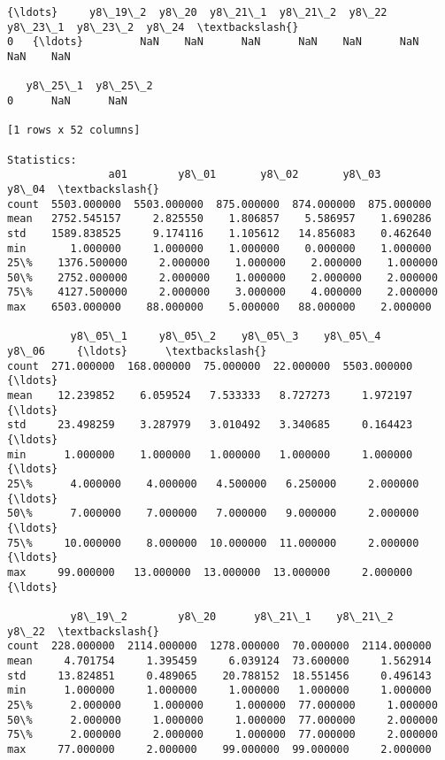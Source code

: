 \documentclass[11pt]{article}
\begin{document}
\begin{Verbatim}[commandchars=\\\{\}]
    {\ldots}     y8\_19\_2  y8\_20  y8\_21\_1  y8\_21\_2  y8\_22  y8\_23\_1  y8\_23\_2  y8\_24  \textbackslash{}
0   {\ldots}         NaN    NaN      NaN      NaN    NaN      NaN      NaN    NaN   

   y8\_25\_1  y8\_25\_2  
0      NaN      NaN  

[1 rows x 52 columns]

Statistics: 
                a01        y8\_01       y8\_02       y8\_03       y8\_04  \textbackslash{}
count  5503.000000  5503.000000  875.000000  874.000000  875.000000   
mean   2752.545157     2.825550    1.806857    5.586957    1.690286   
std    1589.838525     9.174116    1.105612   14.856083    0.462640   
min       1.000000     1.000000    1.000000    0.000000    1.000000   
25\%    1376.500000     2.000000    1.000000    2.000000    1.000000   
50\%    2752.000000     2.000000    1.000000    2.000000    2.000000   
75\%    4127.500000     2.000000    3.000000    4.000000    2.000000   
max    6503.000000    88.000000    5.000000   88.000000    2.000000   

          y8\_05\_1     y8\_05\_2    y8\_05\_3    y8\_05\_4        y8\_06     {\ldots}      \textbackslash{}
count  271.000000  168.000000  75.000000  22.000000  5503.000000     {\ldots}       
mean    12.239852    6.059524   7.533333   8.727273     1.972197     {\ldots}       
std     23.498259    3.287979   3.010492   3.340685     0.164423     {\ldots}       
min      1.000000    1.000000   1.000000   1.000000     1.000000     {\ldots}       
25\%      4.000000    4.000000   4.500000   6.250000     2.000000     {\ldots}       
50\%      7.000000    7.000000   7.000000   9.000000     2.000000     {\ldots}       
75\%     10.000000    8.000000  10.000000  11.000000     2.000000     {\ldots}       
max     99.000000   13.000000  13.000000  13.000000     2.000000     {\ldots}       

          y8\_19\_2        y8\_20      y8\_21\_1    y8\_21\_2        y8\_22  \textbackslash{}
count  228.000000  2114.000000  1278.000000  70.000000  2114.000000   
mean     4.701754     1.395459     6.039124  73.600000     1.562914   
std     13.824851     0.489065    20.788152  18.551456     0.496143   
min      1.000000     1.000000     1.000000   1.000000     1.000000   
25\%      2.000000     1.000000     1.000000  77.000000     1.000000   
50\%      2.000000     1.000000     1.000000  77.000000     2.000000   
75\%      2.000000     2.000000     1.000000  77.000000     2.000000   
max     77.000000     2.000000    99.000000  99.000000     2.000000   


\end{Verbatim}
\end{document}
